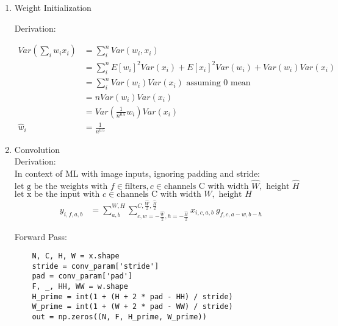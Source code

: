 \documentclass[12pt,letter]{article}
\begin{document}
\begin{enumerate}
  \pagebreak
  
\item Weight Initialization

  Derivation:

  \begin{align*}
    Var(\sum_i w_i x_i) &= \sum_i^n Var(w_i, x_i)\\
                        &= \sum_i^n E[w_i]^2 Var(x_i) + E[x_i]^2 Var(w_i) + Var(w_i) Var(x_i)\\
                        &= \sum_i^n Var(w_i) Var(x_i) \text{ assuming 0 mean}\\
                        &= n Var(w_i) Var(x_i)\\
                        &= Var(\frac{1}{n^{0.5}} w_i) Var(x_i)\\
    \hat{w}_i &= \frac{1}{n^{0.5}}
  \end{align*}

  \pagebreak

\item Convolution\\

  Derivation:\\
  In context of ML with image inputs, ignoring padding and stride:\\
  $\text{let g be the weights with } f \in \text{filters}, c \in \text{channels C with width }\hat{W},\text{ height }\hat{H}$\\
  $\text{let x be the input with }c \in \text{channels C with width }W,\text{ height }H$\\
  \begin{align*}
    y_{i,f,a,b} &= \sum_{a,b}^{W,H} \sum_{c,w=-\frac{\hat{W}}{2},h=-\frac{\hat{H}}{2}}^{C,\frac{\hat{W}}{2},\frac{\hat{H}}{2}} x_{i,c,a,b}\ g_{f,c,a-w,b-h}
  \end{align*}
  
  Forward Pass:
\begin{verbatim}
    N, C, H, W = x.shape
    stride = conv_param['stride']
    pad = conv_param['pad']
    F, _, HH, WW = w.shape
    H_prime = int(1 + (H + 2 * pad - HH) / stride)
    W_prime = int(1 + (W + 2 * pad - WW) / stride)
    out = np.zeros((N, F, H_prime, W_prime))


\end{verbatim}
\end{enumerate}
\end{document}
